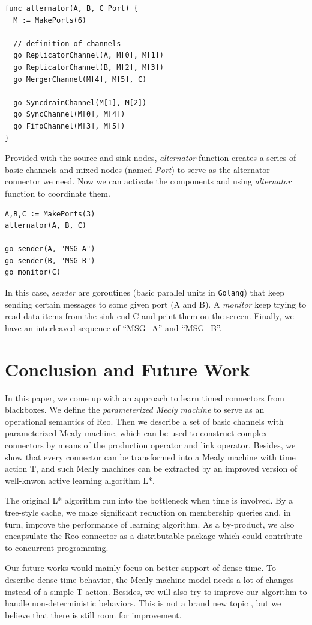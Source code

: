 \documentclass[conference, a4paper]{IEEEtran}
\begin{document}
\begin{lstlisting}
func alternator(A, B, C Port) {
  M := MakePorts(6)

  // definition of channels
  go ReplicatorChannel(A, M[0], M[1])
  go ReplicatorChannel(B, M[2], M[3])
  go MergerChannel(M[4], M[5], C)

  go SyncdrainChannel(M[1], M[2])
  go SyncChannel(M[0], M[4])
  go FifoChannel(M[3], M[5])
}
\end{lstlisting}

Provided with the source and sink nodes, \emph{alternator} function creates a series of basic
channels and mixed nodes (named \emph{Port}) to serve as the alternator connector we need. Now we
can activate the components and using \emph{alternator} function to coordinate them.

\begin{lstlisting}
A,B,C := MakePorts(3)
alternator(A, B, C)

go sender(A, "MSG A")
go sender(B, "MSG B")
go monitor(C)
\end{lstlisting}

In this case, \emph{sender} are goroutines (basic parallel units in \texttt{Golang}) that keep
sending certain messages to some given port (A and B). A \emph{monitor} keep trying to read data
items from the sink end C and print them on the screen. Finally, we have an interleaved sequence of
``MSG\_A'' and ``MSG\_B''.
 
\section{Conclusion and Future Work}
In this paper, we come up with an approach to learn timed connectors from blackboxes. We define
the \emph{parameterized Mealy machine} to serve as an operational semantics of Reo. Then we
describe a set of basic channels with parameterized Mealy machine, which can be used to construct
complex connectors by means of the production operator and link operator.
Besides, we show that every connector can be transformed into a Mealy
machine with time action T, and such Mealy machines can be extracted by an improved version of
well-knwon active learning algorithm L*.

The original L* algorithm run into the bottleneck when time is involved. By a tree-style cache, we
make significant reduction on membership queries and, in turn, improve the performance of learning
algorithm. As a by-product, we also encapsulate the Reo connector as a distributable package which
could contribute to concurrent programming.

Our future works would mainly focus on better support of dense time. To describe dense
time behavior, the Mealy machine model needs a lot of changes instead of a simple T action. Besides,
we will also try to improve our algorithm to handle non-deterministic behaviors. This is not a brand
new topic \cite{DBLP:journals/eceasst/VolpatoT15}, but we believe that there is still room for
improvement.  


\end{document}
